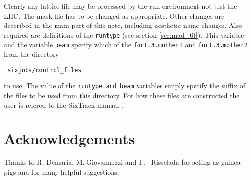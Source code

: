 \documentclass{cernatsnote}    %
\begin{document}
Clearly any lattice file may be processed by the run environment not
just the LHC. The mask file has to be changed as appropriate.
Other changes are described in the main part of this
note, including aesthetic name changes. Also required are definitions
of the {\tt runtype} (see section \ref{sec:mad_6t}). This variable
and the variable {\tt beam} specify which of the {\tt fort.3.mother1} and {\tt fort.3.mother2}
from the directory
\begin{verbatim}
 sixjobs/control_files
\end{verbatim}
to use. The value of the {\tt runtype and beam} variables simply specify the suffix
of the files to be used from this directory. For how these files are
constructed the user is refered to the SixTrack manual \cite{SixTrack}.
\section{Acknowledgements}
Thanks to R. Demaria, M. Giovannozzi and T. ~Risselada
for acting as guinea pigs and for many helpful suggestions.
\end{document}
